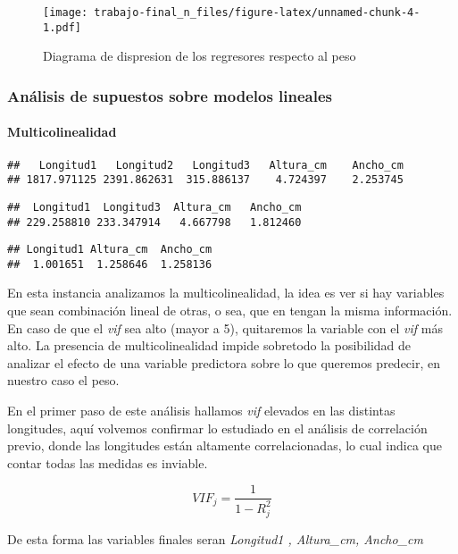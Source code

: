 \documentclass[
]{article}
\begin{document}
\begin{figure}
\centering
\texttt{[image: trabajo-final\_n\_files/figure-latex/unnamed-chunk-4-1.pdf]}
\caption{Diagrama de dispresion de los regresores respecto al peso}
\end{figure}

\subsubsection{Análisis de supuestos sobre modelos
lineales}\label{anuxe1lisis-de-supuestos-sobre-modelos-lineales}

\paragraph{Multicolinealidad}\label{multicolinealidad}

\begin{verbatim}
##   Longitud1   Longitud2   Longitud3   Altura_cm    Ancho_cm 
## 1817.971125 2391.862631  315.886137    4.724397    2.253745
\end{verbatim}

\begin{verbatim}
##  Longitud1  Longitud3  Altura_cm   Ancho_cm 
## 229.258810 233.347914   4.667798   1.812460
\end{verbatim}

\begin{verbatim}
## Longitud1 Altura_cm  Ancho_cm 
##  1.001651  1.258646  1.258136
\end{verbatim}

En esta instancia analizamos la multicolinealidad, la idea es ver si hay
variables que sean combinación lineal de otras, o sea, que en tengan la
misma información. En caso de que el \emph{vif} sea alto (mayor a 5),
quitaremos la variable con el \emph{vif} más alto. La presencia de
multicolinealidad impide sobretodo la posibilidad de analizar el efecto
de una variable predictora sobre lo que queremos predecir, en nuestro
caso el peso.

En el primer paso de este análisis hallamos \emph{vif} elevados en las
distintas longitudes, aquí volvemos confirmar lo estudiado en el
análisis de correlación previo, donde las longitudes están altamente
correlacionadas, lo cual indica que contar todas las medidas es
inviable.

\[VIF_{j} = \frac{1}{1-R^{2}_{j}}\]

De esta forma las variables finales seran \emph{Longitud1 , Altura\_cm,
Ancho\_cm}
\end{document}
